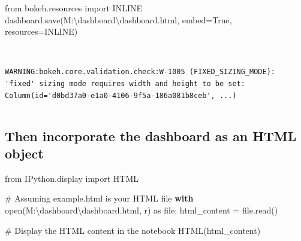 \documentclass[
  letterpaper,
  DIV=11,
  numbers=noendperiod]{scrreprt}
\newenvironment{Shaded}{\begin{snugshade}}{\end{snugshade}}
\newcommand{\BuiltInTok}[1]{\textcolor[rgb]{0.00,0.23,0.31}{#1}}
\newcommand{\CommentTok}[1]{\textcolor[rgb]{0.37,0.37,0.37}{#1}}
\newcommand{\ControlFlowTok}[1]{\textcolor[rgb]{0.00,0.23,0.31}{\textbf{#1}}}
\newcommand{\ImportTok}[1]{\textcolor[rgb]{0.00,0.46,0.62}{#1}}
\newcommand{\NormalTok}[1]{\textcolor[rgb]{0.00,0.23,0.31}{#1}}
\newcommand{\OperatorTok}[1]{\textcolor[rgb]{0.37,0.37,0.37}{#1}}
\newcommand{\StringTok}[1]{\textcolor[rgb]{0.13,0.47,0.30}{#1}}
\newcommand{\VariableTok}[1]{\textcolor[rgb]{0.07,0.07,0.07}{#1}}
\begin{document}
\begin{Shaded}
\begin{Highlighting}[]
\ImportTok{from}\NormalTok{ bokeh.resources }\ImportTok{import}\NormalTok{ INLINE}
\NormalTok{dashboard.save(}\StringTok{\textquotesingle{}M:\textbackslash{}dashboard\textbackslash{}dashboard.html\textquotesingle{}}\NormalTok{, embed}\OperatorTok{=}\VariableTok{True}\NormalTok{, resources}\OperatorTok{=}\NormalTok{INLINE)}
\end{Highlighting}
\end{Shaded}

\begin{verbatim}
                                                                                                                       
\end{verbatim}

\begin{verbatim}
WARNING:bokeh.core.validation.check:W-1005 (FIXED_SIZING_MODE): 'fixed' sizing mode requires width and height to be set: Column(id='d0bd37a0-e1a0-4106-9f5a-186a081b8ceb', ...)
\end{verbatim}

\begin{verbatim}
\end{verbatim}

\subsection{Then incorporate the dashboard as an HTML
object}\label{then-incorporate-the-dashboard-as-an-html-object}

\begin{Shaded}
\begin{Highlighting}[]
\ImportTok{from}\NormalTok{ IPython.display }\ImportTok{import}\NormalTok{ HTML}

\CommentTok{\# Assuming \textquotesingle{}example.html\textquotesingle{} is your HTML file}
\ControlFlowTok{with} \BuiltInTok{open}\NormalTok{(}\StringTok{\textquotesingle{}M:\textbackslash{}dashboard\textbackslash{}dashboard.html\textquotesingle{}}\NormalTok{, }\StringTok{\textquotesingle{}r\textquotesingle{}}\NormalTok{) }\ImportTok{as} \BuiltInTok{file}\NormalTok{:}
\NormalTok{    html\_content }\OperatorTok{=} \BuiltInTok{file}\NormalTok{.read()}

\CommentTok{\# Display the HTML content in the notebook}
\NormalTok{HTML(html\_content)}
\end{Highlighting}
\end{Shaded}
\end{document}
